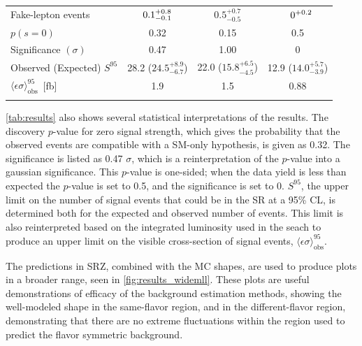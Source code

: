 \begin{table}
\begin{center}
\begin{tabular*}{\textwidth}{@{\extracolsep{\fill}}lccc}
 Fake-lepton events                                                         & $\makebox[3ex]{\hfill 0.1}_{-0.1}^{+0.8}$   & $0.5_{-0.5}^{+0.7}$ &   $\makebox[3ex]{\hfill 0}^{+0.2}$    \\
 \noalign{\smallskip}\hline\noalign{\smallskip}
$p(s=0)$                                                                    & 0.32      & 0.15        & 0.5        \\
Significance $(\sigma)$                                                               & 0.47                     & 1.00                   & 0           \\
Observed (Expected) $S^{95}$                                                & 28.2 ($24.5_{-6.7}^{+8.9}$) & 22.0 ($15.8_{-4.5}^{+6.5}$) & 12.9 ($14.0_{-3.9}^{+5.7}$) \\
$\langle\epsilon\sigma\rangle^{95}_\text{obs}$~[fb]                         & 1.9             & 1.5                    & 0.88   \\
 \noalign{\smallskip}\hline\noalign{\smallskip}
\end{tabular*}
\end{center}
\label{tab:results}
\end{table}

\autoref{tab:results} also shows several statistical interpretations of the results. The discovery $p$-value for zero signal strength, which gives the probability that the observed events are compatible with a \ac{SM}-only hypothesis, is given as 0.32. The significance is listed as 0.47 $\sigma$, which is a reinterpretation of the $p$-value into a gaussian significance. This $p$-value is one-sided; when the data yield is less than expected the $p$-value is set to 0.5, and the significance is set to 0. $S^{95}$, the upper limit on the number of signal events that could be in the \ac{SR} at a 95\% \ac{CL}, is determined both for the expected and observed number of events. This limit is also reinterpreted based on the integrated luminosity used in the seach to produce an upper limit on the visible cross-section of signal events, $\langle\epsilon\sigma\rangle^{95}_\text{obs}$.

The predictions in SRZ, combined with the \ac{MC} shapes, are used to produce plots in a broader \mll range, seen in \autoref{fig:results_widemll}. These plots are useful demonstrations of efficacy of the background estimation methods, showing the well-modeled \dyjets shape in the same-flavor region, and in the different-flavor region, demonstrating that there are no extreme fluctuations within the region used to predict the flavor symmetric background.

